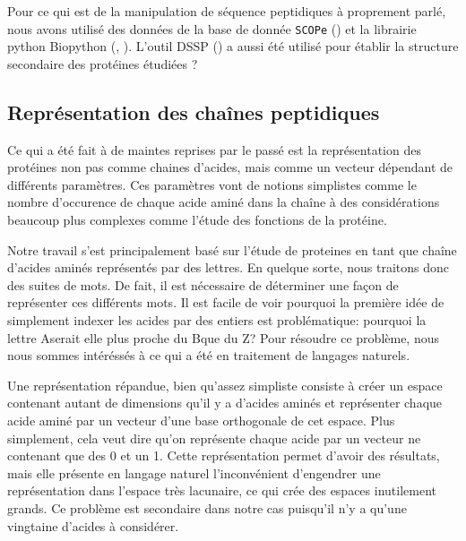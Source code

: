 \documentclass[a4paper, journal, 11pt, onecolumn]{IEEEtran}
\begin{document}
Pour ce qui est de la manipulation de séquence peptidiques à proprement parlé,
nous avons utilisé des données de la base de donnée \texttt{SCOPe}
(\cite{fox2014scope}) et la librairie python Biopython (\cite{Cock01062009},
\cite{hamelryck2003pdb}). L'outil DSSP (\cite{kabsch1983dictionary}) a aussi été
utilisé pour établir la structure secondaire des protéines étudiées ?

\subsection{Représentation des chaînes peptidiques}

Ce qui a été fait à de maintes reprises par le passé est la représentation des
protéines non pas comme chaines d'acides, mais comme un vecteur dépendant de
différents paramètres. Ces paramètres vont de notions simplistes comme le nombre
d'occurence de chaque acide aminé dans la chaîne à des considérations beaucoup
plus complexes comme l'étude des fonctions de la protéine.

Notre travail s'est principalement basé sur l'étude de proteines en tant que
chaîne d'acides aminés représentés par des lettres. En quelque sorte, nous traitons donc des suites de \og
mots\fg. De fait, il est nécessaire de déterminer une façon de représenter ces
différents mots. Il est facile de voir pourquoi la première idée de simplement
indexer les acides par des entiers est problématique: pourquoi la lettre \og
A\fg serait elle plus proche du \og B\fg que du \og Z\fg? Pour résoudre ce
problème, nous nous sommes intéréssés à ce qui a été en traitement de langages
naturels.

Une représentation répandue, bien qu'assez simpliste consiste à créer un espace
contenant autant de dimensions qu'il y a d'acides aminés et représenter chaque
acide aminé par un vecteur d'une base orthogonale de cet espace. Plus
simplement, cela veut dire qu'on représente chaque acide par un vecteur ne
contenant que des 0 et un 1. Cette représentation permet d'avoir des résultats,
mais elle présente en langage naturel l'inconvénient d'engendrer une
représentation dans l'espace très lacunaire, ce qui crée des espaces inutilement
grands. Ce problème est secondaire dans notre cas puisqu'il n'y a qu'une
vingtaine d'acides à considérer.
\end{document}
